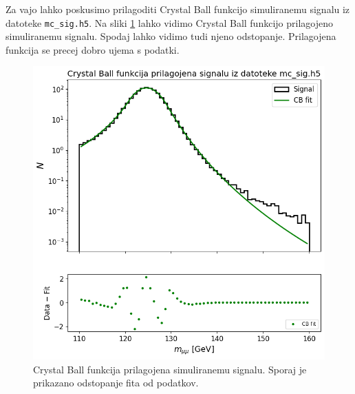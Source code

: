 \documentclass[slovene,11pt,a4paper]{article}
\begin{document}
Za vajo lahko poskusimo prilagoditi Crystal Ball funkcijo simuliranemu signalu iz datoteke \texttt{mc\_sig.h5}. Na sliki \ref{fig:CB} lahko vidimo Crystal Ball funkcijo prilagojeno simuliranemu signalu. Spodaj lahko vidimo tudi njeno odstopanje. Prilagojena funkcija se precej dobro ujema s podatki.

\begin{figure}[h!]
    \centering
    \includegraphics[width=0.8\linewidth]{imgs/CB.png}
    \caption{Crystal Ball funkcija prilagojena simuliranemu signalu. Sporaj je prikazano odstopanje fita od podatkov.}
    \label{fig:CB}
\end{figure}
\end{document}
